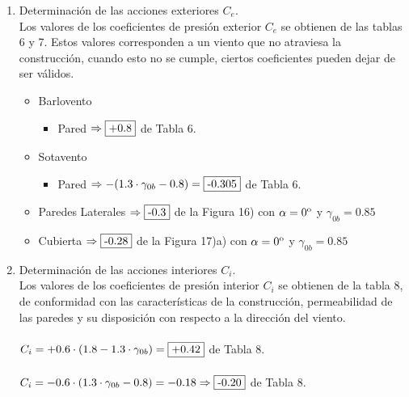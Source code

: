 \begin{enumerate}
\item Determinación de las acciones exteriores $C_e$.\\
Los valores de los coeficientes de presión exterior $C_e$ se obtienen de las tablas 6 y 7. Estos valores corresponden a un viento que no atraviesa la construcción, cuando esto no se cumple, ciertos coeficientes pueden dejar de ser válidos.\\
\begin{itemize}
	\item Barlovento	
		\begin{itemize}
		\item Pared $\Rightarrow \framebox{+0.8} $ de Tabla 6.
		\end{itemize}
	\item Sotavento
		\begin{itemize}
		\item Pared $\Rightarrow -(1.3 \cdot \gamma_{0b}-0.8) = \framebox{-0.305}$ de Tabla 6.
		\end{itemize}
	\item Paredes Laterales $\Rightarrow \framebox{-0.3} $ de la Figura 16) con $\alpha = 0\textsuperscript{o} $ y $\gamma_{0b}=0.85$
    \item Cubierta $\Rightarrow \framebox{-0.28} $ de la Figura 17)a) con $\alpha = 0\textsuperscript{o} $ y $\gamma_{0b}=0.85$
\end{itemize}

\item Determinación de las acciones interiores $C_i$.\\
Los valores de los coeficientes de presión interior $C_i$ se obtienen de la tabla 8, de conformidad con las características de la construcción, permeabilidad de las paredes y su disposición con respecto a la dirección del viento.\\
\\
$ C_i = + 0.6 \cdot (1.8 -1.3 \cdot \gamma_{0b}) = \framebox{+0.42} $ de Tabla 8.\\
\\
$ C_i = - 0.6 \cdot (1.3 \cdot \gamma_{0b} - 0.8) = -0.18 \Rightarrow \framebox{-0.20} $ de Tabla 8.\\


\end{enumerate}

